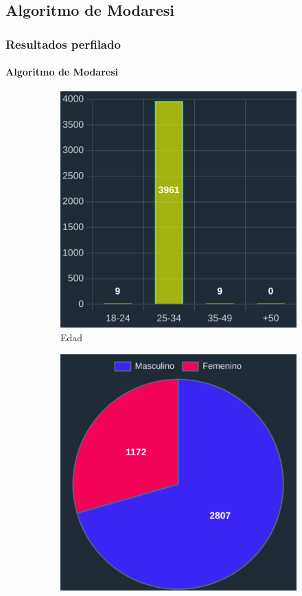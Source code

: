 \documentclass{beamer}
\begin{document}
\subsection{Algoritmo de Modaresi}
\begin{frame}
	\frametitle{Resultados perfilado}
	\framesubtitle{Algoritmo de Modaresi}
	\begin{figure}[H]
		\centering
		\begin{subfigure}{0.3\textwidth}
			\includegraphics[width=\textwidth]{imaxes/capturas-app/graficos/modaresi/grafico-edad-moda.png}
			\caption{Edad}
			\label{subfig:blm/resultados-edad-moda}
		\end{subfigure}
		\begin{subfigure}{0.3\textwidth}
			\includegraphics[width=\textwidth]{imaxes/capturas-app/graficos/modaresi/grafico-genero.png}

\end{subfigure}
\end{figure}
\end{frame}
\end{document}
